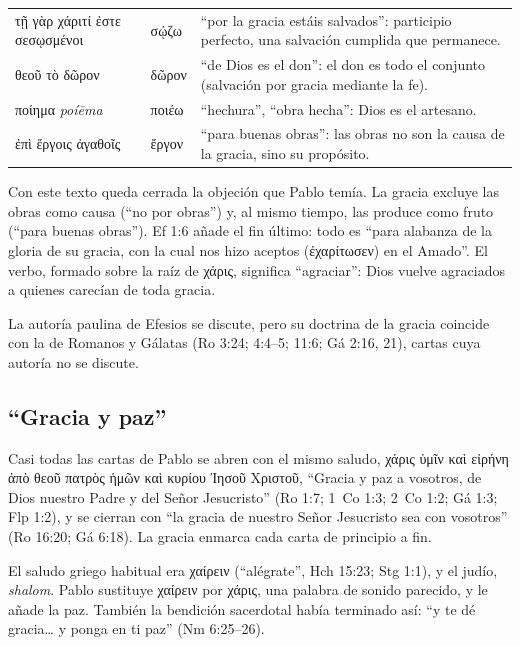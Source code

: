 \documentclass[11pt,letterpaper]{article}
\newcommand{\grc}[1]{\foreignlanguage{ancientgreek}{#1}}
\begin{document}
\begin{filologia}[Ef 2:8--10]
\begin{tabular}{@{}L{3.6cm}L{1.6cm}L{9.6cm}@{}}
\grc{τῇ γὰρ χάριτί ἐστε σεσῳσμένοι} & \grc{σῴζω} & ``por la gracia estáis salvados'': participio perfecto, una salvación cumplida que permanece. \\[2pt]
\grc{θεοῦ τὸ δῶρον} & \grc{δῶρον} & ``de Dios es el don'': el don es todo el conjunto (salvación por gracia mediante la fe). \\[2pt]
\grc{ποίημα} \emph{poíēma} & \grc{ποιέω} & ``hechura'', ``obra hecha'': Dios es el artesano. \\[2pt]
\grc{ἐπὶ ἔργοις ἀγαθοῖς} & \grc{ἔργον} & ``para buenas obras'': las obras no son la causa de la gracia, sino su propósito. \\
\end{tabular}
\end{filologia}

Con este texto queda cerrada la objeción que Pablo temía. La gracia excluye las obras como causa (``no por obras'') y, al mismo tiempo, las produce como fruto (``para buenas obras''). Ef 1:6 añade el fin último: todo es ``para alabanza de la gloria de su gracia, con la cual nos hizo aceptos (\grc{ἐχαρίτωσεν}) en el Amado''. El verbo, formado sobre la raíz de \grc{χάρις}, significa ``agraciar'': Dios vuelve agraciados a quienes carecían de toda gracia.

\begin{nota}[Precisión]
La autoría paulina de Efesios se discute, pero su doctrina de la gracia coincide con la de Romanos y Gálatas (Ro 3:24; 4:4--5; 11:6; Gá 2:16, 21), cartas cuya autoría no se discute.
\end{nota}

\subsection{``Gracia y paz''}\label{sec:gracia-paz}
Casi todas las cartas de Pablo se abren con el mismo saludo, \grc{χάρις ὑμῖν καὶ εἰρήνη ἀπὸ θεοῦ πατρὸς ἡμῶν καὶ κυρίου Ἰησοῦ Χριστοῦ}, ``Gracia y paz a vosotros, de Dios nuestro Padre y del Señor Jesucristo'' (Ro 1:7; 1~Co 1:3; 2~Co 1:2; Gá 1:3; Flp 1:2), y se cierran con ``la gracia de nuestro Señor Jesucristo sea con vosotros'' (Ro 16:20; Gá 6:18). La gracia enmarca cada carta de principio a fin.

El saludo griego habitual era \grc{χαίρειν} (``alégrate'', Hch 15:23; Stg 1:1), y el judío, \emph{shalom}. Pablo sustituye \grc{χαίρειν} por \grc{χάρις}, una palabra de sonido parecido, y le añade la paz. También la bendición sacerdotal había terminado así: ``y te dé gracia\ldots{} y ponga en ti paz'' (Nm 6:25--26).
\end{document}
